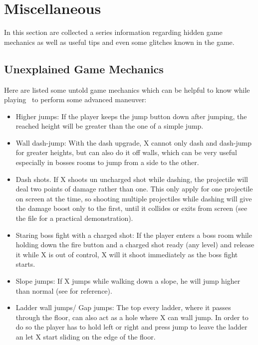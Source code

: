 \chapter{Miscellaneous}\label{X1:misc} %
In this section are collected a series information regarding hidden game mechanics as well as useful tips and even some glitches known in the game.

\section{Unexplained Game Mechanics}
Here are listed some untold game mechanics which can be helpful to know while playing~\cite{RTA_wiki:X1} to perform some advanced maneuver: 
\begin{itemize}
	\item Higher jumps: If the player keeps the jump button down after jumping, the reached height will be greater than the one of a simple jump.
	
	\item Wall dash-jump: With the dash upgrade, X cannot only dash and dash-jump for greater heights, but can also do it off walls, which can be very useful especially in bosses rooms to jump from a side to the other.
	
	\item Dash shots. If X shoots un uncharged shot while dashing, the projectile will deal two points of damage rather than one. This only apply for one projectile on screen at the time, so shooting multiple projectiles while dashing will give the damage boost only to the first, until it collides or exits from screen (see the file  for a practical demonstration).
	
	\item Staring boss fight with a charged shot: If the player enters a boss room while holding down the fire button and a charged shot ready (any level) and release it while X is out of control, X will it shoot immediately as the boss fight starts.
	
	\item Slope jumps: If X jumps while walking down a slope, he will jump higher than normal (see  for reference).
	
	\item Ladder wall jumps/ Gap jumps: The top every ladder, where it passes through the floor, can also act as a hole where X can wall jump. In order to do so the player has to hold left or right and press jump to leave the ladder an let X start sliding on the edge of the floor.
	

\end{itemize}
